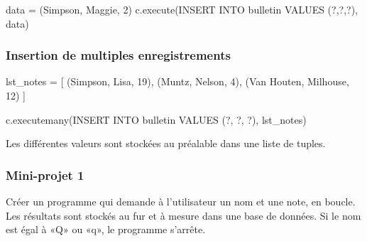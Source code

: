 \documentclass[
  a4paper,
  DIV=11,
  numbers=noendperiod]{scrartcl}
\newenvironment{Shaded}{\begin{snugshade}}{\end{snugshade}}
\newcommand{\DecValTok}[1]{\textcolor[rgb]{0.68,0.00,0.00}{#1}}
\newcommand{\NormalTok}[1]{\textcolor[rgb]{0.00,0.23,0.31}{#1}}
\newcommand{\OperatorTok}[1]{\textcolor[rgb]{0.37,0.37,0.37}{#1}}
\newcommand{\StringTok}[1]{\textcolor[rgb]{0.13,0.47,0.30}{#1}}
\begin{document}
\begin{Shaded}
\begin{Highlighting}[]
\NormalTok{data }\OperatorTok{=}\NormalTok{ (}\StringTok{\textquotesingle{}Simpson\textquotesingle{}}\NormalTok{, }\StringTok{\textquotesingle{}Maggie\textquotesingle{}}\NormalTok{, }\DecValTok{2}\NormalTok{)}
\NormalTok{c.execute(}\StringTok{\textquotesingle{}\textquotesingle{}\textquotesingle{}INSERT INTO bulletin VALUES (?,?,?)\textquotesingle{}\textquotesingle{}\textquotesingle{}}\NormalTok{, data)}
\end{Highlighting}
\end{Shaded}

\hypertarget{insertion-de-multiples-enregistrements}{%
\subsubsection{Insertion de multiples
enregistrements}\label{insertion-de-multiples-enregistrements}}

\begin{Shaded}
\begin{Highlighting}[]
\NormalTok{lst\_notes }\OperatorTok{=}\NormalTok{ [ (}\StringTok{\textquotesingle{}Simpson\textquotesingle{}}\NormalTok{, }\StringTok{\textquotesingle{}Lisa\textquotesingle{}}\NormalTok{, }\DecValTok{19}\NormalTok{), (}\StringTok{\textquotesingle{}Muntz\textquotesingle{}}\NormalTok{, }\StringTok{\textquotesingle{}Nelson\textquotesingle{}}\NormalTok{, }\DecValTok{4}\NormalTok{), (}\StringTok{\textquotesingle{}Van Houten\textquotesingle{}}\NormalTok{, }\StringTok{\textquotesingle{}Milhouse\textquotesingle{}}\NormalTok{, }\DecValTok{12}\NormalTok{) ]}

\NormalTok{c.executemany(}\StringTok{\textquotesingle{}\textquotesingle{}\textquotesingle{}INSERT INTO bulletin VALUES (?, ?, ?)\textquotesingle{}\textquotesingle{}\textquotesingle{}}\NormalTok{, lst\_notes)}
\end{Highlighting}
\end{Shaded}

Les différentes valeurs sont stockées au préalable dans une liste de
tuples.

\hypertarget{mini-projet-1}{%
\subsubsection{Mini-projet 1}\label{mini-projet-1}}

Créer un programme qui demande à l'utilisateur un nom et une note, en
boucle. Les résultats sont stockés au fur et à mesure dans une base de
données. Si le nom est égal à «Q» ou «q», le programme s'arrête.
\end{document}

